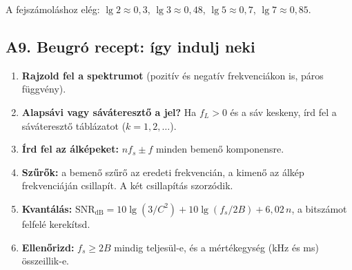 \par{}\par

A fejszámoláshoz elég: $\lg2\approx0{,}3$, $\lg3\approx0{,}48$, $\lg5\approx0{,}7$, $\lg7\approx0{,}85$.

\subsection{\texorpdfstring{A9. Beugró recept: így indulj neki}{A9. Beugró recept: így indulj neki}}\label{a2-recept}
\begin{enumerate}
\item \textbf{Rajzold fel a spektrumot} (pozitív és negatív frekvenciákon is, páros függvény).
\item \textbf{Alapsávi vagy sáváteresztő a jel?} Ha $f_L>0$ és a sáv keskeny, írd fel a sáváteresztő táblázatot ($k=1,2,\ldots$).
\item \textbf{Írd fel az álképeket:} $n f_s\pm f$ minden bemenő komponensre.
\item \textbf{Szűrők:} a bemenő szűrő az eredeti frekvencián, a kimenő az álkép frekvenciáján csillapít. A két csillapítás szorzódik.
\item \textbf{Kvantálás:} $\text{SNR}_{\mathrm{dB}}=10\lg(3/C^2)+10\lg(f_s/2B)+6{,}02\,n$, a bitszámot felfelé kerekítsd.
\item \textbf{Ellenőrizd:} $f_s\ge 2B$ mindig teljesül-e, és a mértékegység (kHz és ms) összeillik-e.
\end{enumerate}

